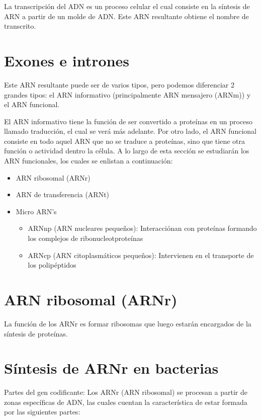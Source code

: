 
La transcripción del ADN es un proceso celular el cual consiste en la síntesis de ARN a partir de un molde de ADN. Este ARN resultante obtiene el nombre de transcrito.

\section{Exones e intrones}\label{sec:Exones_e_intrones}

Este ARN resultante puede ser de varios tipos, pero podemos diferenciar 2 grandes tipos: el ARN informativo (principalmente ARN mensajero (ARNm)) y el ARN funcional.

El ARN informativo tiene la función de ser convertido a proteínas en un proceso llamado traducción, el cual se verá más adelante. Por otro lado, el ARN funcional consiste en todo aquel ARN que no se traduce a proteínas, sino que tiene otra función o actividad dentro la célula. A lo largo de esta sección se estudiarán los ARN funcionales, los cuales se enlistan a continuación:

\begin{itemize}
    \item ARN ribosomal (ARNr)
    \item ARN de transferencia (ARNt)
    \item Micro ARN's
	    \begin{itemize}
	        \item ARNnp (ARN nucleares pequeños): Interacciónan con proteínas formando los complejos de ribonucleotproteínas
	        \item ARNcp (ARN citoplasmáticos pequeños): Intervienen en el transporte de los polipéptidos
	    \end{itemize}
\end{itemize}

\section{ARN ribosomal (ARNr)}

La función de los ARNr es formar ribosomas que luego estarán encargados de la síntesis de proteínas.

\section{Síntesis de ARNr en bacterias}

Partes del gen codificante: Los ARNr (ARN ribosomal) se procesan a partir de zonas específicas de ADN, las cuales cuentan la característica de estar formada por las siguientes partes:

